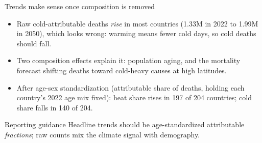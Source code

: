 \documentclass[aspectratio=169,11pt]{beamer}
\begin{document}


\begin{frame}{Trends make sense once composition is removed}
  \begin{itemize}
    \item Raw cold-attributable deaths \emph{rise} in most countries
      (1.33M in 2022 to 1.99M in 2050), which looks wrong: warming means
      fewer cold days, so cold deaths should fall.
    \item Two composition effects explain it: population aging, and the
      mortality forecast shifting deaths toward cold-heavy causes at high
      latitudes.
    \item After age-sex standardization (attributable share of deaths,
      holding each country's 2022 age mix fixed): heat share rises in 197
      of 204 countries; cold share falls in 140 of 204.
  \end{itemize}
  \begin{alertblock}{Reporting guidance}
    Headline trends should be age-standardized attributable
    \emph{fractions}; raw counts mix the climate signal with demography.
  \end{alertblock}
\end{frame}
\end{document}
